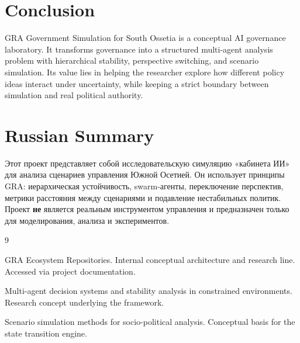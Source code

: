 \documentclass[11pt,a4paper]{article}
\begin{document}
\section{Conclusion}

GRA Government Simulation for South Ossetia is a conceptual AI governance laboratory. It transforms governance into a structured multi-agent analysis problem with hierarchical stability, perspective switching, and scenario simulation. Its value lies in helping the researcher explore how different policy ideas interact under uncertainty, while keeping a strict boundary between simulation and real political authority.

\section*{Russian Summary}

Этот проект представляет собой исследовательскую симуляцию «кабинета ИИ» для анализа сценариев управления Южной Осетией. Он использует принципы GRA: иерархическая устойчивость, swarm-агенты, переключение перспектив, метрики расстояния между сценариями и подавление нестабильных политик. Проект \textbf{не} является реальным инструментом управления и предназначен только для моделирования, анализа и экспериментов.

\begin{thebibliography}{9}

GRA Ecosystem Repositories. Internal conceptual architecture and research line. Accessed via project documentation.

Multi-agent decision systems and stability analysis in constrained environments. Research concept underlying the framework.

Scenario simulation methods for socio-political analysis. Conceptual basis for the state transition engine.

\end{thebibliography}
\end{document}
